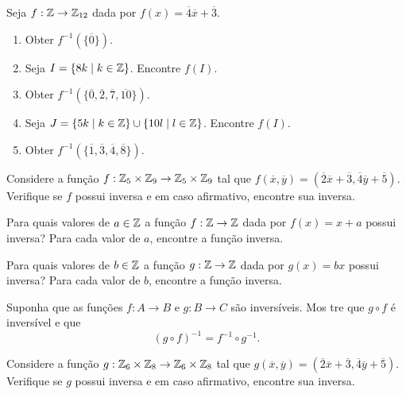 \documentclass[12pt]{exam}
\begin{document}
    \questao{} Seja $f : \mathbb{Z} \to \mathbb{Z}_{12}$ dada por $f(x) = \overline{4}\overline{x} + \overline{3}$.
    \begin{enumerate}[label={\alph*})]
        \item Obter $f^{-1}(\{\overline{0}\})$.

        \item Seja $I = \{8k \mid k \in \mathbb{Z}\}$. Encontre $f(I)$.

        \item Obter $f^{-1}(\{\overline{0}, \overline{2}, \overline{7}, \overline{10}\})$.

        \item Seja $J = \{5k \mid k \in \mathbb{Z}\} \cup \{10l \mid l \in \mathbb{Z}\}$. Encontre $f(I)$.

        \item Obter $f^{-1}(\{\overline{1}, \overline{3}, \overline{4}, \overline{8}\})$.
    \end{enumerate}

    \vspace{.3cm}

    \questao{} Considere a fun{\c c}{\~a}o $f : \mathbb{Z}_5 \times \mathbb{Z}_9 \to \mathbb{Z}_5 \times \mathbb{Z}_9$ tal que $f(\overline{x},\overline{y}) = (\overline{2} \overline{x} + \overline{3}, \overline{4}\overline{y} + \overline{5})$. Verifique se $f$ possui inversa e em caso afirmativo, encontre sua inversa.

    \vspace{.3cm}

    \questao{} Para quais valores de $a \in \mathbb{Z}$ a função $f : \mathbb{Z} \to \mathbb{Z}$ dada por $f(x)       = x + a$ possui inversa? Para cada valor de $a$, encontre a função inversa.

    \vspace{.3cm}

    \questao{} Para quais valores de $b \in \mathbb{Z}$ a função $g : \mathbb{Z} \to \mathbb{Z}$ dada por $g(x)       = bx$ possui inversa? Para cada valor de $b$, encontre a função inversa.

    \vspace{.3cm}

    \questao{} Suponha que as funções $f : A \to B$ e $g : B \to C$ são inversíveis. Mos      tre que $g \circ f$ é inversível e que
    \[
        (g \circ f)^{-1} = f^{-1} \circ g^{-1}.
    \]

    \vspace{.3cm}

    \questao{} Considere a fun{\c c}{\~a}o $g : \mathbb{Z}_6 \times \mathbb{Z}_8 \to \mathbb{Z}_6 \times \mathbb{Z}_8$ tal que $g(\overline{x},\overline{y}) = (\overline{2} \overline{x} + \overline{3}, \overline{4}\overline{y} + \overline{5})$. Verifique se $g$ possui inversa e em caso afirmativo, encontre sua inversa.
\end{document}

